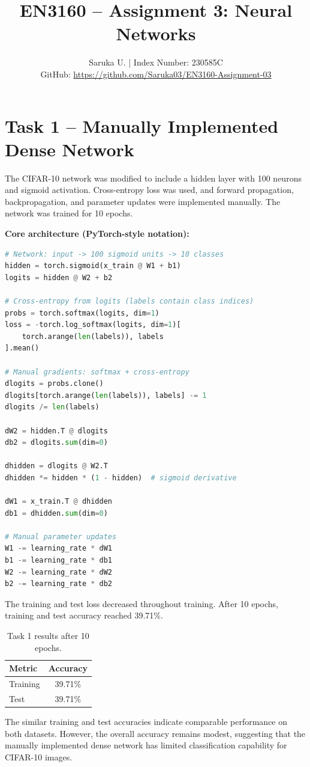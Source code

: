 \documentclass[9pt,a4paper]{article}
\title{\vspace{-1.2cm}\textcolor{titlered}{\textbf{EN3160 -- Assignment 3: Neural Networks}}}
\author{Saruka U. \quad | \quad Index Number: 230585C\\
\small GitHub: \url{https://github.com/Saruka03/EN3160-Assignment-03}}
\date{}
\begin{document}
\maketitle
\vspace{-1.2cm}

\section*{Task 1 -- Manually Implemented Dense Network}
The CIFAR-10 network was modified to include a hidden layer with 100 neurons and sigmoid activation. Cross-entropy loss was used, and forward propagation, backpropagation, and parameter updates were implemented manually. The network was trained for 10 epochs.

\textbf{Core architecture (PyTorch-style notation):}
\begin{lstlisting}[language=Python, caption={Manual forward and backward pass for Task 1}]
# Network: input -> 100 sigmoid units -> 10 classes
hidden = torch.sigmoid(x_train @ W1 + b1)
logits = hidden @ W2 + b2

# Cross-entropy from logits (labels contain class indices)
probs = torch.softmax(logits, dim=1)
loss = -torch.log_softmax(logits, dim=1)[
    torch.arange(len(labels)), labels
].mean()

# Manual gradients: softmax + cross-entropy
dlogits = probs.clone()
dlogits[torch.arange(len(labels)), labels] -= 1
dlogits /= len(labels)

dW2 = hidden.T @ dlogits
db2 = dlogits.sum(dim=0)

dhidden = dlogits @ W2.T
dhidden *= hidden * (1 - hidden)  # sigmoid derivative

dW1 = x_train.T @ dhidden
db1 = dhidden.sum(dim=0)

# Manual parameter updates
W1 -= learning_rate * dW1
b1 -= learning_rate * db1
W2 -= learning_rate * dW2
b2 -= learning_rate * db2
\end{lstlisting}

The training and test loss decreased throughout training. After 10 epochs, training and test accuracy reached 39.71\%.

\begin{table}[H]\centering
\caption{Task 1 results after 10 epochs.}
\begin{tabular}{lc}\toprule
Metric & Accuracy\\\midrule
Training & 39.71\%\\
Test & 39.71\%\\\bottomrule
\end{tabular}
\end{table}
The similar training and test accuracies indicate comparable performance on both datasets. However, the overall accuracy remains modest, suggesting that the manually implemented dense network has limited classification capability for CIFAR-10 images.
\end{document}

